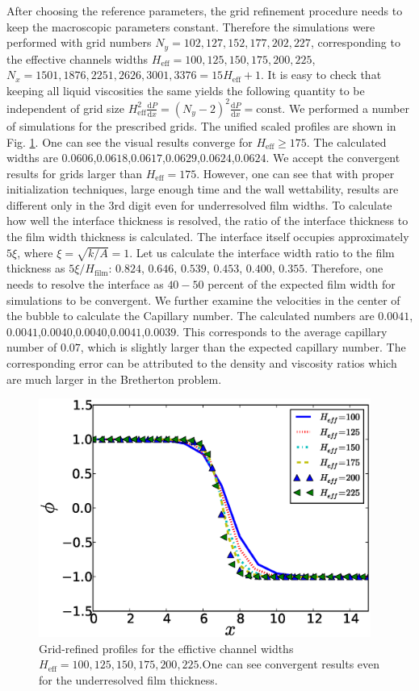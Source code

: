 \documentclass{article}
\begin{document}
After choosing the reference parameters, the grid refinement procedure
needs to keep the macroscopic parameters constant.  Therefore the simulations
were performed with grid numbers $N_y=102,127,152,177,202,227$, corresponding to the
effective channels widths  $H_{\mathrm{eff}}=100,125,150,175,200,225$,
$N_x=1501,1876,2251,2626,3001,3376=15
H_{\mathrm{eff}}+1$. It is easy to check
that keeping all liquid viscosities the same yields the following quantity to
be independent of grid size
$H_{\mathrm{eff}}^2\frac{\mathrm{d}P}{\mathrm{d}x}=(N_y-2)^2\frac{\mathrm{d}P}{\mathrm{d}
x } = \mathrm{const}$. We performed a number of simulations for the prescribed grids.
The unified scaled profiles are shown in Fig. \ref{fig:grid:profiles}. One can
see the visual results converge for $H_{\mathrm{eff}}\geq 175$. The calculated widths
are $0.0606$,$0.0618$,$0.0617$,$0.0629$,$0.0624$,$0.0624$. We accept the
convergent results for grids larger than $H_{\mathrm{eff}}=175$. However, one can see
that with proper initialization techniques, large enough time and the wall
wettability, results are different only in the 3rd digit even for
underresolved film widths. To calculate how well the interface thickness is
resolved, the ratio of the interface thickness to the film width thickness is calculated. The
interface itself occupies approximately $5 \xi$, where
$\xi=\sqrt{k/A}=1$. Let us calculate the interface width ratio to the film
thickness as
$5\xi/H_{\mathrm{film}}$: $0.824$, $0.646$,  $0.539$, $0.453$,
$0.400$, $0.355$. Therefore, one needs to
resolve the interface as $40-50$ percent of the
expected film width for simulations to be convergent. We further examine the
velocities in the center of the bubble to calculate the Capillary number. The
calculated numbers are $0.0041$, $0.0041$,$0.0040$,$0.0040$,$0.0041$,$0.0039$.
This corresponds to the average capillary number of $0.07$, which is slightly
larger than the expected capillary number. The corresponding error can be
attributed to the density and viscosity ratios which are much larger in the
Bretherton problem.
\begin{figure}
\includegraphics[width=0.97\textwidth]{Figures/Grid/norm_grid_profs.eps}
\caption{Grid-refined profiles for the effictive
channel widths
$H_{\mathrm{eff}}=100,125,150,175,200,225$.One can see
convergent results even for the underresolved film
thickness.\label{fig:grid:profiles}}
\end{figure}
\end{document}

